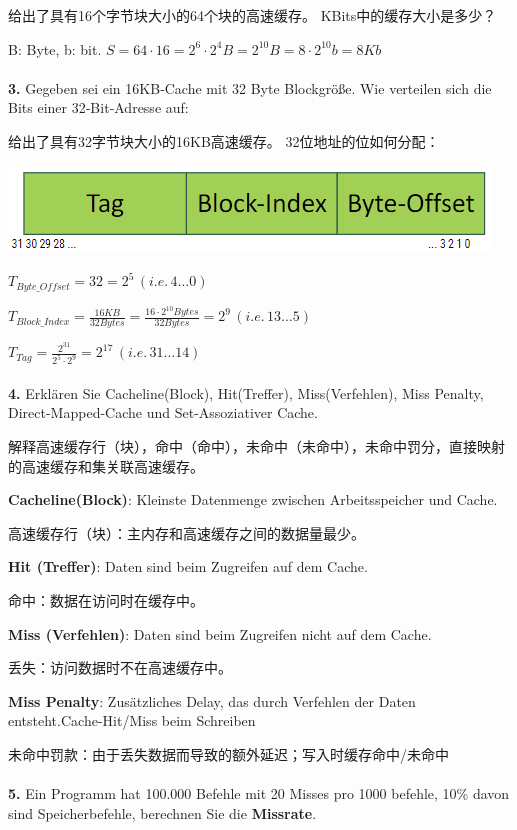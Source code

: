 \documentclass[fleqn]{article}
\begin{document}
给出了具有16个字节块大小的64个块的高速缓存。 KBits中的缓存大小是多少？

B: Byte, b: bit. $S=64\cdot 16 = 2^6\cdot 2^4 B=2^{10}B=8\cdot 2^{10}b=8Kb$
\\
\\
\noindent\textbf{3.} Gegeben sei ein 16KB‐Cache mit 32 Byte Blockgröße. Wie verteilen sich die Bits einer 32‐Bit‐Adresse auf:

给出了具有32字节块大小的16KB高速缓存。 32位地址的位如何分配：

\begin{center}
    \includegraphics[scale=0.5]{9.png}
\end{center}

$T_{Byte\_Offset}=32=2^5 \,(i.e.\, 4\dots0)$

$T_{Block\_Index}=\frac{16KB}{32Bytes}=\frac{16\cdot 2^10 Bytes}{32Bytes}=2^9\,(i.e.\,13\dots5)$

$T_{Tag} = \frac{2^{31}}{2^5\cdot 2^9}=2^{17}\,(i.e.\, 31\dots 14)$
\\
\\
\noindent\textbf{4.} Erklären Sie Cacheline(Block), Hit(Treffer), Miss(Verfehlen), Miss Penalty, Direct-Mapped-Cache und Set-Assoziativer Cache.

解释高速缓存行（块），命中（命中），未命中（未命中），未命中罚分，直接映射的高速缓存和集关联高速缓存。

\textbf{Cacheline(Block)}: Kleinste Datenmenge zwischen Arbeitsspeicher und Cache.

高速缓存行（块）：主内存和高速缓存之间的数据量最少。

\textbf{Hit (Treffer)}: Daten sind beim Zugreifen auf dem Cache.

命中：数据在访问时在缓存中。

\textbf{Miss (Verfehlen)}: Daten sind beim Zugreifen nicht auf dem Cache.

丢失：访问数据时不在高速缓存中。

\textbf{Miss Penalty}: Zusätzliches Delay, das durch Verfehlen der Daten entsteht.Cache-Hit/Miss beim Schreiben

未命中罚款：由于丢失数据而导致的额外延迟；写入时缓存命中/未命中
\\
\\
\noindent\textbf{5.} Ein Programm hat 100.000 Befehle mit 20 Misses pro 1000 befehle, 10\% davon sind Speicherbefehle, berechnen Sie die \textbf{Missrate}.
\end{document}
